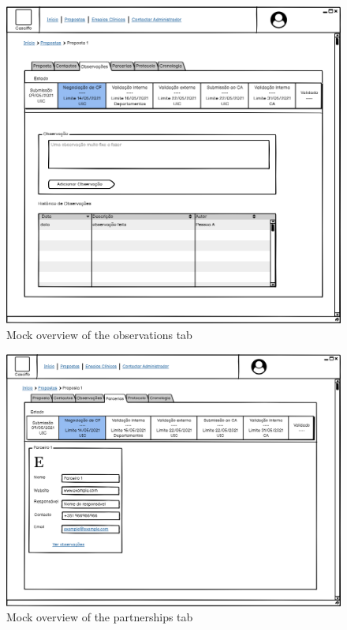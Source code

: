 \begin{figure}[H]
    \centering
    \includegraphics[scale=0.35]{images/proposta-observações.png}
    \caption{Mock overview of the observations tab}
    \label{fig:proposta-observações}
\end{figure}

\begin{figure}[H]
    \centering
    \includegraphics[scale=0.35]{images/proposta-parcerias.png}
    \caption{Mock overview of the partnerships tab}
    \label{fig:proposta-parcerias}
\end{figure}

